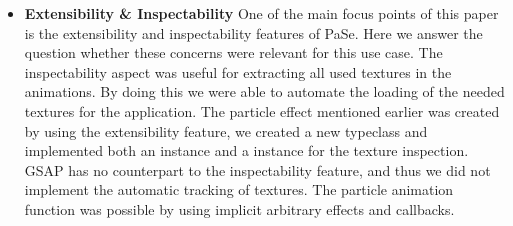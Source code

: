 \begin{itemize}
\item \textbf{Extensibility \& Inspectability} One of the main focus points of this paper is the extensibility and inspectability features of PaSe. Here we answer the question whether these concerns were relevant for this use case. The inspectability aspect was useful for extracting all used textures in the animations. By doing this we were able to automate the loading of the needed textures for the application. The particle effect mentioned earlier was created by using the extensibility feature, we created a new  typeclass and implemented both an  instance and a  instance for the texture inspection. GSAP has no counterpart to the inspectability feature, and thus we did not implement the automatic tracking of textures. The particle animation function was possible by using implicit arbitrary effects and callbacks.
\end{itemize}
